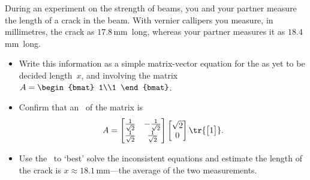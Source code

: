 \sectionExercises


\begin{exercise}  
During an experiment on the strength of beams, you and your partner measure the length of a crack in the beam.
With vernier callipers you measure, in millimetres, the crack as \(17.8\)\,mm~long, whereas your partner measures it as \(18.4\)\,mm~long.
\begin{itemize}
\item Write this information as a simple matrix-vector equation for the as yet to be decided length~\(x\), and involving the matrix \(A=\begin{bmat} 1\\1 \end{bmat}\).
\item Confirm that an \svd\ of the matrix is
\begin{equation*}
A=\begin{bmatrix} \frac1{\sqrt2}&-\frac1{\sqrt2}
\\\frac1{\sqrt2}&\frac1{\sqrt2} \end{bmatrix}
\begin{bmatrix} \sqrt2\\0 \end{bmatrix}
\tr{\begin{bmatrix} 1 \end{bmatrix}}.
\end{equation*}
\item Use the \svd\ to `best' solve the inconsistent equations and estimate the length of the crack is \(x\approx 18.1\)\,mm---the average of the two measurements.
\end{itemize}
\end{exercise}



